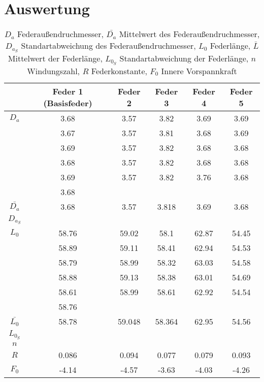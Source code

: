 \newpage
\section{Auswertung}

\begin{table}
    \centering
    \begin{tabular}{c | c c c c c}
        \toprule
        & Feder 1 (Basisfeder) & Feder 2 & Feder 3 & Feder 4 & Feder 5 \\
        \midrule
        $D_a$ & 3.68 & 3.57 & 3.82 & 3.69 & 3.69 \\
          & 3.67 & 3.57 & 3.81 & 3.68 & 3.69 \\
          & 3.69 & 3.57 & 3.82 & 3.68 & 3.68 \\
          & 3.68 & 3.57 & 3.82 & 3.68 & 3.68 \\
          & 3.69 & 3.57 & 3.82 & 3.76 & 3.68 \\
          & 3.68 &         &         &         &         \\
        \midrule
        $\bar{D_a}$ & 3.68 & 3.57 & 3.818 & 3.69 & 3.68\\
        $D_{a_S}$ & & & & & \\
        \midrule
        $L_0$ & 58.76 & 59.02 & 58.1 & 62.87 & 54.45 \\
          & 58.89 & 59.11 & 58.41 & 62.94 & 54.53 \\
          & 58.79 & 58.99 & 58.32 & 63.03 & 54.58 \\
          & 58.88 & 59.13 & 58.38 & 63.01 & 54.69 \\
          & 58.61 & 58.99 & 58.61 & 62.92 & 54.54 \\
          & 58.76 &         &         &         &         \\
        \midrule
        $\bar{L_0}$ & 58.78 & 59.048 & 58.364 & 62.95 & 54.56\\
        $L_{0_S}$ & & & & & \\
        \midrule
        $n$ & & & & & \\
        \midrule
        $R$ & 0.086 & 0.094 & 0.077 & 0.079 & 0.093 \\
        \midrule
        $F_0$ & -4.14 & -4.57 & -3.63 & -4.03 & -4.26 \\
        \bottomrule
    \end{tabular}
    \caption{$D_a$ Federaußendruchmesser, 
             $\bar{D_a}$ Mittelwert des Federaußendruchmesser, 
             $D_{a_S}$ Standartabweichung des Federaußendruchmesser,
             $L_0$ Federlänge,
             $\bar{L}$ Mittelwert der Federlänge,
             $L_{0_S}$ Standartabweichung der Federlänge,
             $n$ Windungszahl,
             $R$ Federkonstante,
             $F_0$ Innere Vorspannkraft
    }
    \label{tab:Wertetabelle}
\end{table}



